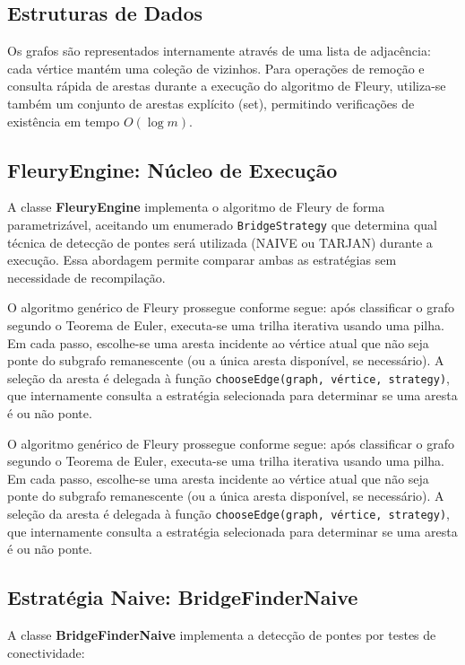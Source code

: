 \documentclass{sbc2023}%
\begin{document}
\subsection{Estruturas de Dados}

Os grafos são representados internamente através de uma lista de adjacência: cada vértice mantém uma coleção de vizinhos. Para operações de remoção e consulta rápida de arestas durante a execução do algoritmo de Fleury, utiliza-se também um conjunto de arestas explícito (set), permitindo verificações de existência em tempo $O(\log m)$.

\subsection{FleuryEngine: Núcleo de Execução}

A classe \textbf{FleuryEngine} implementa o algoritmo de Fleury de forma parametrizável, aceitando um enumerado \texttt{BridgeStrategy} que determina qual técnica de detecção de pontes será utilizada (NAIVE ou TARJAN) durante a execução. Essa abordagem permite comparar ambas as estratégias sem necessidade de recompilação.

O algoritmo genérico de Fleury prossegue conforme segue: após classificar o grafo segundo o Teorema de Euler, executa-se uma trilha iterativa usando uma pilha. Em cada passo, escolhe-se uma aresta incidente ao vértice atual que não seja ponte do subgrafo remanescente (ou a única aresta disponível, se necessário). A seleção da aresta é delegada à função \texttt{chooseEdge(graph, vértice, strategy)}, que internamente consulta a estratégia selecionada para determinar se uma aresta é ou não ponte.

O algoritmo genérico de Fleury prossegue conforme segue: após classificar o grafo segundo o Teorema de Euler, executa-se uma trilha iterativa usando uma pilha. Em cada passo, escolhe-se uma aresta incidente ao vértice atual que não seja ponte do subgrafo remanescente (ou a única aresta disponível, se necessário). A seleção da aresta é delegada à função \texttt{chooseEdge(graph, vértice, strategy)}, que internamente consulta a estratégia selecionada para determinar se uma aresta é ou não ponte.

\subsection{Estratégia Naive: BridgeFinderNaive}

A classe \textbf{BridgeFinderNaive} implementa a detecção de pontes por testes de conectividade:
\end{document}
